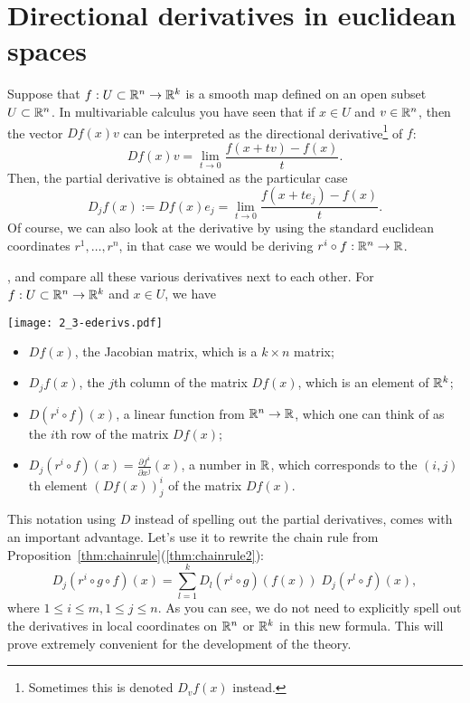\section{Directional derivatives in euclidean spaces}\label{sec:dd}

Suppose that $f: U\subset\mathbb{R}^n\to\mathbb{R}^k$ is a smooth map defined on an open subset $U\subset \mathbb{R}^n$.
In multivariable calculus you have seen that if $x\in U$ and $v\in\mathbb{R}^n$, then the vector $Df(x) v$ can be interpreted as the directional derivative\footnote{Sometimes this is denoted $D_v f(x)$ instead.} of $f$:
\begin{equation}
  Df(x) v = \lim_{t\to0}\frac{f(x+tv) - f(x)}{t}.
\end{equation}
Then, the partial derivative is obtained as the particular case
\begin{equation}
  D_jf(x) := Df(x) e_j = \lim_{t\to0} \frac{f(x+te_j) - f(x)}{t}.
\end{equation}
Of course, we can also look at the derivative by using the standard euclidean coordinates $r^1, \ldots, r^n$, in that case we would be deriving $r^i \circ f : \mathbb{R}^n \to \mathbb{R}$.

, and compare all these various derivatives next to each other.
For $f:U\subset\mathbb{R}^n\to\mathbb{R}^k$ and $x\in U$, we have
\begin{marginfigure}[3.5cm]
  \texttt{[image: 2\_3-ederivs.pdf]}
\end{marginfigure}
\begin{itemize}
  \item $Df(x)$, the Jacobian matrix, which is a $k\times n$ matrix;
  \item $D_j f(x)$, the $j$th column of the matrix $Df(x)$, which is an element of $\mathbb{R}^k$;
  \item $D(r^i\circ f)(x)$, a linear function from $\mathbb{R}^n \to \mathbb{R}$, which one can think of as the $i$th row of the matrix $Df(x)$;
  \item $D_j(r^i\circ f)(x) = \frac{\partial f^i}{\partial x^j}(x)$, a number in $\mathbb{R}$, which corresponds to the $(i,j)$th element $(Df(x))_j^i$ of the matrix $Df(x)$.
\end{itemize}

This notation using $D$ instead of spelling out the partial derivatives, comes with an important advantage.
Let's use it to rewrite the chain rule from Proposition~\ref{thm:chainrule}(\ref{thm:chainrule2}):
\begin{equation}
  D_j(r^i\circ g \circ f) (x) = \sum_{l=1}^k D_l(r^i\circ g)(f(x))\; D_j(r^l \circ f)(x),
\end{equation}
where $1\leq i\leq m, 1\leq j \leq n$.
As you can see, we do not need to explicitly spell out the derivatives in local coordinates on $\mathbb{R}^n$ or $\mathbb{R}^k$ in this new formula.
This will prove extremely convenient for the development of the theory.


